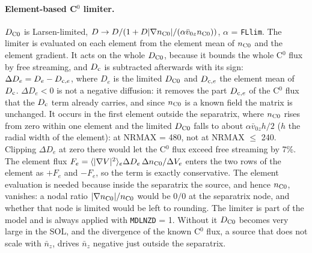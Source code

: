 \documentclass[11pt]{article}
\def\r#1{{\rm#1}}
\def\aves#1{\langle#1\rangle}
\def\nnz{\bar{n}_{z}}
\begin{document}
\paragraph{Element-based C$^0$ limiter.}
$D_\r{C0}$ is Larsen-limited, $D\to D/(1+D|\nabla n_\r{C0}|/(\alpha\bar v_{0z}n_\r{C0}))$,
$\alpha$ = \texttt{FLlim}.  The limiter is evaluated on each element from the
element mean of $n_\r{C0}$ and the element gradient.  It acts on the whole
$D_\r{C0}$, because it bounds the whole C$^0$ flux by free streaming, and
$D_\r{c}$ is subtracted afterwards with its sign: $\Delta D_e = D_e - D_{\r{c},e}$, where
$D_e$ is the limited $D_\r{C0}$ and $D_{\r{c},e}$ the element mean of $D_\r{c}$.
$\Delta D_e<0$ is not a negative diffusion: it removes the part $D_{\r{c},e}$ of the C$^0$
flux that the $D_\r{c}$ term already carries, and since $n_\r{C0}$ is a known field
the matrix is unchanged.  It occurs in the first element outside the separatrix,
where $n_\r{C0}$ rises from zero within one element and the limited $D_\r{C0}$ falls to
about $\alpha\bar v_{0z}h/2$ ($h$ the radial width of the element): at NRMAX = 480,
not at NRMAX $\le$ 240.  Clipping $\Delta D_e$ at zero there would let the C$^0$ flux
exceed free streaming by 7\%.  The element flux
$F_e = \aves{|\nabla V|^2}_e \Delta D_e\,\Delta n_\r{C0}/\Delta V_e$ enters the two
rows of the element as $+F_e$ and $-F_e$, so the term is exactly conservative.
The element evaluation is needed because inside the separatrix the source, and
hence $n_\r{C0}$, vanishes: a nodal ratio $|\nabla n_\r{C0}|/n_\r{C0}$ would be
$0/0$ at the separatrix node, and whether that node is limited would be left to
rounding.  The limiter is part of the model and is always applied with
\texttt{MDLNZD} = 1.  Without it $D_\r{C0}$ becomes very large in the SOL, and the
divergence of the known C$^0$ flux, a source that does not scale with $\nnz$,
drives $\nnz$ negative just outside the separatrix.
\end{document}
